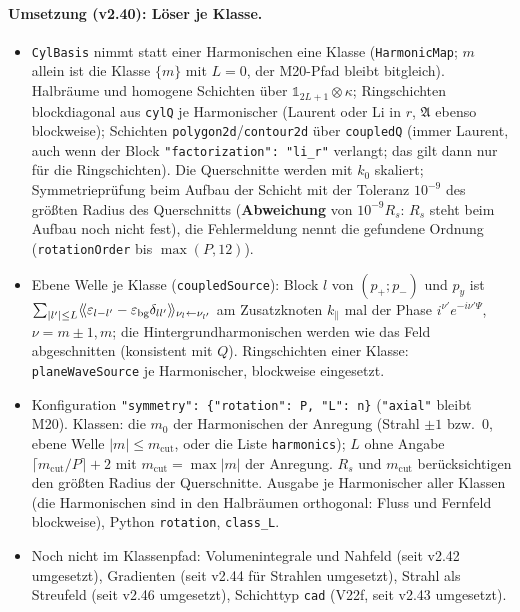 \paragraph{Umsetzung (v2.40): Löser je Klasse.}
\begin{itemize}[nosep]
  \item \verb|CylBasis| nimmt statt einer Harmonischen eine Klasse (\verb|HarmonicMap|; $m$ allein ist die Klasse
        $\{m\}$ mit $L=0$, der M20-Pfad bleibt bitgleich). Halbräume und homogene Schichten über
        $\mathbb 1_{2L+1}\otimes\kappa$; Ringschichten blockdiagonal aus \verb|cylQ| je Harmonischer (Laurent oder Li in $r$,
        $\mathfrak A$ ebenso blockweise); Schichten \verb|polygon2d|/\verb|contour2d| über \verb|coupledQ| (immer Laurent,
        auch wenn der Block \verb|"factorization": "li_r"| verlangt; das gilt dann nur für die Ringschichten). Die
        Querschnitte werden mit $k_0$ skaliert; Symmetrieprüfung beim Aufbau der Schicht mit der Toleranz $10^{-9}$ des
        größten Radius des Querschnitts (\textbf{Abweichung} von $10^{-9}R_s$: $R_s$ steht beim Aufbau noch nicht fest),
        die Fehlermeldung nennt die gefundene Ordnung (\verb|rotationOrder| bis $\max(P,12)$).
  \item Ebene Welle je Klasse (\verb|coupledSource|): Block $l$ von $(p_+;p_-)$ und $p_y$ ist
        $\sum_{|l'|\le L}\langle\!\langle \varepsilon_{l-l'}-\varepsilon_{\text{bg}}\delta_{l l'}\rangle\!\rangle_{\nu_l\leftarrow\nu_{l'}}$ am
        Zusatzknoten $k_\parallel$ mal der Phase $i^{\nu'}e^{-i\nu'\Psi}$, $\nu=m\pm1,m$; die Hintergrundharmonischen
        werden wie das Feld abgeschnitten (konsistent mit $Q$). Ringschichten einer Klasse: \verb|planeWaveSource| je
        Harmonischer, blockweise eingesetzt.
  \item Konfiguration \verb|"symmetry": {"rotation": P, "L": n}| (\verb|"axial"| bleibt M20). Klassen: die $m_0$ der
        Harmonischen der Anregung (Strahl $\pm1$ bzw.\ $0$, ebene Welle $|m|\le m_{\text{cut}}$, oder die Liste
        \verb|harmonics|); $L$ ohne Angabe $\lceil m_{\text{cut}}/P\rceil+2$ mit $m_{\text{cut}}=\max|m|$ der Anregung.
        $R_s$ und $m_{\text{cut}}$ berücksichtigen den größten Radius der Querschnitte. Ausgabe je Harmonischer aller
        Klassen (die Harmonischen sind in den Halbräumen orthogonal: Fluss und Fernfeld blockweise), Python
        \verb|rotation|, \verb|class_L|.
  \item Noch nicht im Klassenpfad: Volumenintegrale und Nahfeld (seit v2.42 umgesetzt), Gradienten (seit v2.44 für
        Strahlen umgesetzt), Strahl als Streufeld (seit v2.46 umgesetzt), Schichttyp \verb|cad| (V22f, seit v2.43 umgesetzt).

\end{itemize}
